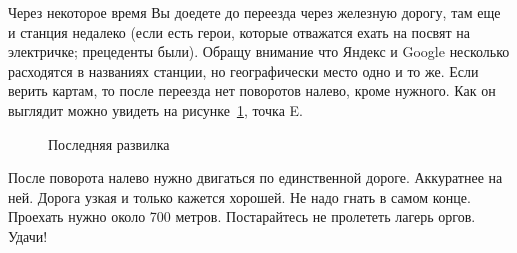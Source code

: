 \documentclass[a4paper, 12pt]{extarticle}
\begin{document}
\par Через некоторое время Вы доедете до переезда через железную дорогу, там еще и станция недалеко (если есть герои, которые отважатся ехать на посвят на электричке; прецеденты были). Обращу внимание что Яндекс и Google несколько расходятся в названиях станции, но географически место одно и то же. Если верить картам, то после переезда нет поворотов налево, кроме нужного. Как он выглядит можно увидеть на рисунке~\ref{ris:last}, точка E.
\begin{figure}[h!]
	\caption{Последняя развилка}
	\label{ris:last}
\end{figure}

\par После поворота налево нужно двигаться по единственной дороге. Аккуратнее на ней. Дорога узкая и только кажется хорошей. Не надо гнать в самом конце. Проехать нужно около 700 метров. Постарайтесь не пролететь лагерь оргов. Удачи!
\end{document}
